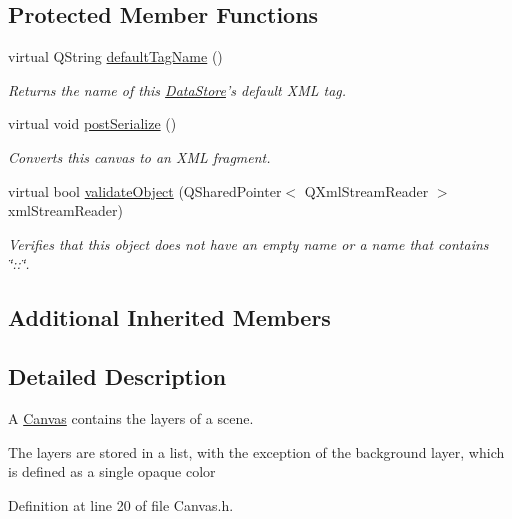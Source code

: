 \subsection*{Protected Member Functions}
\begin{DoxyCompactItemize}
\item 
virtual Q\-String \hyperlink{class_picto_1_1_canvas_a64087c0912577bc16f3c5ad59f2cc645}{default\-Tag\-Name} ()
\begin{DoxyCompactList}\small\item\em Returns the name of this \hyperlink{class_picto_1_1_data_store}{Data\-Store}'s default X\-M\-L tag. \end{DoxyCompactList}\item 
virtual void \hyperlink{class_picto_1_1_canvas_ac9ff7842aa7cf37f4933970ab5aabd77}{post\-Serialize} ()
\begin{DoxyCompactList}\small\item\em Converts this canvas to an X\-M\-L fragment. \end{DoxyCompactList}\item 
\hypertarget{class_picto_1_1_canvas_a584e05795bbbe555563a6ffefe3e38cf}{virtual bool \hyperlink{class_picto_1_1_canvas_a584e05795bbbe555563a6ffefe3e38cf}{validate\-Object} (Q\-Shared\-Pointer$<$ Q\-Xml\-Stream\-Reader $>$ xml\-Stream\-Reader)}\label{class_picto_1_1_canvas_a584e05795bbbe555563a6ffefe3e38cf}

\begin{DoxyCompactList}\small\item\em Verifies that this object does not have an empty name or a name that contains \char`\"{}\-::\char`\"{}. \end{DoxyCompactList}\end{DoxyCompactItemize}
\subsection*{Additional Inherited Members}


\subsection{Detailed Description}
A \hyperlink{class_picto_1_1_canvas}{Canvas} contains the layers of a scene. 

The layers are stored in a list, with the exception of the background layer, which is defined as a single opaque color 

Definition at line 20 of file Canvas.\-h.



